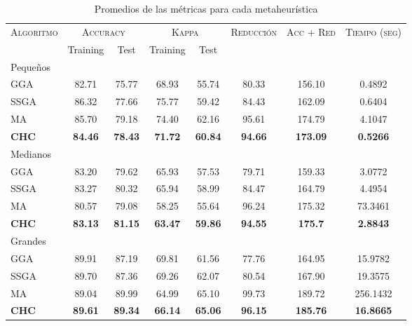 \begin{table}[h!]
\centering
\begin{adjustbox}{max width =\textwidth}
\begin{tabular}{l c c c c c c c}
\hline
\multirow{2}{*}{\textsc{Algoritmo}}
	& \multicolumn{2}{c}{\textsc{Accuracy}}
	& \multicolumn{2}{c}{\textsc{Kappa}}
	& \textsc{Reducción}
	& \textsc{Acc + Red}
	& \textsc{Tiempo (seg)} \\
	& Training & Test
	& Training & Test \\ 
\hline
\hline

Pequeños\\
GGA  & 82.71 & 75.77 & 68.93 & 55.74 & 80.33 & 156.10 & 0.4892 \\
SSGA & 86.32 & 77.66 & 75.77 & 59.42 & 84.43 & 162.09 & 0.6404 \\
MA   & 85.70 & 79.18 & 74.40 & 62.16 & 95.61 & 174.79 & 4.1047 \\
\textbf{CHC}  & \textbf{84.46} & \textbf{78.43} & \textbf{71.72} & \textbf{60.84} & \textbf{94.66} & \textbf{173.09} & \textbf{0.5266} \\

\hline

Medianos\\
GGA  & 83.20 & 79.62 & 65.93 & 57.53 & 79.71 & 159.33 & 3.0772 \\
SSGA & 83.27 & 80.32 & 65.94 & 58.99 & 84.47 & 164.79 & 4.4954 \\
MA   & 80.57 & 79.08 & 58.25 & 55.64 & 96.24 & 175.32 & 73.3461 \\
\textbf{CHC}  & \textbf{83.13} & \textbf{81.15} & \textbf{63.47} & \textbf{59.86} & \textbf{94.55} & \textbf{175.7}  & \textbf{2.8843} \\

\hline
Grandes\\
GGA  & 89.91 & 87.19 & 69.81 & 61.56 & 77.76 & 164.95 & 15.9782 \\
SSGA & 89.70 & 87.36 & 69.26 & 62.07 & 80.54 & 167.90 & 19.3575 \\
MA   & 89.04 & 89.99 & 64.99 & 65.10 & 99.73 & 189.72 & 256.1432 \\
\textbf{CHC}  & \textbf{89.61} & \textbf{89.34} & \textbf{66.14} & \textbf{65.06} & \textbf{96.15} & \textbf{185.76} & \textbf{16.8665} \\

\hline
\end{tabular}
\end{adjustbox}
\caption{Promedios de las métricas para cada metaheurística}
\label{meta}

\end{table}

